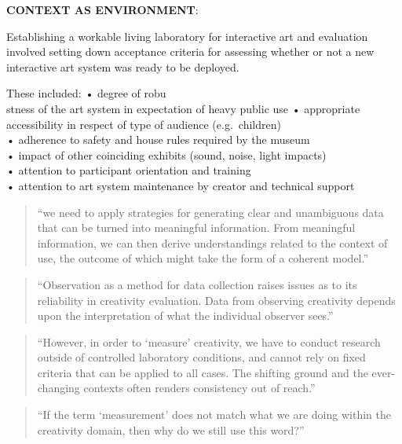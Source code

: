 \textbf{CONTEXT AS ENVIRONMENT}: \parencite[p.21]{Candy2012}

Establishing a workable living laboratory for interactive art and evaluation involved setting down acceptance criteria for assessing whether or not a new interactive art system was ready to be deployed.

These included:
•	degree of robu\\stness of the art system in expectation of heavy public use
•	appropriate accessibility in respect of type of audience (e.g.\ children)\\
•	adherence to safety and house rules required by the museum\\
•	impact of other coinciding exhibits (sound, noise, light impacts)\\
•	attention to participant orientation and training\\
•	attention to art system maintenance by creator and technical support

\begin{quote}
  ``we need to apply strategies for generating clear and unambiguous data that can be turned into meaningful information. From meaningful information, we can then derive understandings related to the context of use, the outcome of which might take the form of a coherent model.'' \parencite[p.21]{Candy2012}
\end{quote}

\begin{quote}
  ``Observation as a method for data collection raises issues as to its reliability in creativity evaluation. Data from observing creativity depends upon the interpretation of what the individual observer sees.'' \parencite[p.22]{Candy2012}
\end{quote}

\begin{quote}
  ``However, in order to ‘measure’ creativity, we have to conduct research outside of controlled laboratory conditions, and cannot rely on fixed criteria that can be applied to all cases. The shifting ground and the ever-changing contexts often renders consistency out of reach.'' \parencite[p.22]{Candy2012}
\end{quote}

\begin{quote}
  ``If the term `measurement' does not match what we are doing within the creativity domain, then why do we still use this word?'' \parencite[p.22]{Candy2012}
\end{quote}


